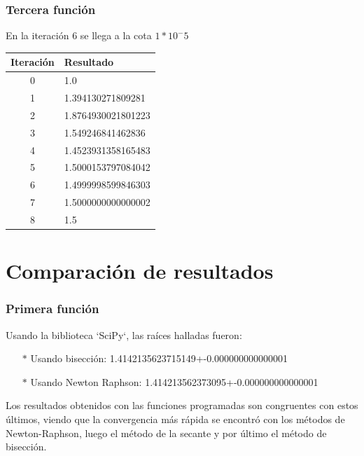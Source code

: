 \documentclass[titlepage,a4paper]{article}
\begin{document}
\subsubsection{Tercera función}\label{sec:sec3}
En la iteración 6 se llega a la cota $1*10^-5$
\begin{center}
\begin{tabular}{| c | l  |}
    \hline
     Iteración & Resultado \\ \hline
  0     &  1.0 \\
1     &  1.394130271809281 \\
2     &  1.8764930021801223 \\
3     &  1.549246841462836 \\
4     &  1.4523931358165483 \\
5     &  1.5000153797084042 \\
6     &  1.4999998599846303 \\
7     &  1.5000000000000002 \\
8     &  1.5 \\
    \hline
    \end{tabular}
\end{center}

\newpage

\section{Comparación de resultados}\label{sec:comparacion_resultados}
\subsubsection{Primera función}\label{sec:CR1}

Usando la biblioteca `SciPy`, las raíces halladas fueron:
\begin{itemize}
    \item[$*$]Usando bisección:  1.4142135623715149+-0.000000000000001
    \item[$*$]Usando Newton Raphson:  1.414213562373095+-0.000000000000001
\end{itemize}

Los resultados obtenidos con las funciones programadas son congruentes con estos últimos, viendo que la convergencia más rápida se encontró con los métodos de Newton-Raphson, luego el método de la secante y por último el método de bisección.
\end{document}
